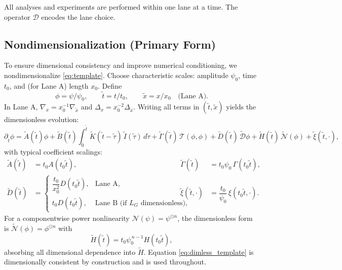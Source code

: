 \documentclass{article}
\theoremstyle{plain}
\begin{document}
All analyses and experiments are performed within one lane at a time. The operator $\mathcal{D}$ encodes the lane choice.

\subsection{Nondimensionalization (Primary Form)}

To ensure dimensional consistency and improve numerical conditioning, we nondimensionalize \eqref{eq:template}. Choose characteristic scales: amplitude $\psi_0$, time $t_0$, and (for Lane A) length $x_0$. Define
\begin{equation}
\phi = \psi/\psi_0,\qquad \tilde{t} = t/t_0,\qquad \tilde{x} = x/x_0\quad\text{(Lane A)}.
\label{eq:dimless_vars}
\end{equation}
In Lane A, $\nabla_x = x_0^{-1}\nabla_{\tilde{x}}$ and $\Delta_x = x_0^{-2}\Delta_{\tilde{x}}$. Writing all terms in $(\tilde{t},\tilde{x})$ yields the dimensionless evolution:
\begin{equation}
\partial_{\tilde{t}}\phi
= \tilde{A}(\tilde{t})\phi
+ \tilde{B}(\tilde{t})\int_{0}^{\tilde{t}}\tilde{K}(\tilde{t}-\tilde{\tau})\,\tilde{I}(\tilde{\tau})\,d\tilde{\tau}
+ \tilde{\Gamma}(\tilde{t})\,\mathcal{T}(\phi,\phi)
+ \tilde{D}(\tilde{t})\,\tilde{\mathcal{D}}\phi
+ \tilde{H}(\tilde{t})\,\tilde{\mathcal{N}}(\phi)
+ \tilde{\xi}(\tilde{t},\cdot),
\label{eq:dimless_template}
\end{equation}
with typical coefficient scalings:
\begin{align}
\tilde{A}(\tilde{t}) &= t_0 A(t_0\tilde{t}), &
\tilde{\Gamma}(\tilde{t}) &= t_0\psi_0\,\Gamma(t_0\tilde{t}), \\
\tilde{D}(\tilde{t}) &=
\begin{cases}
\dfrac{t_0}{x_0^2}D(t_0\tilde{t}), & \text{Lane A},\\[6pt]
t_0D(t_0\tilde{t}), & \text{Lane B (if $L_G$ dimensionless)},
\end{cases} &
\tilde{\xi}(\tilde{t},\cdot) &= \dfrac{t_0}{\psi_0}\,\xi(t_0\tilde{t},\cdot).
\label{eq:scalings}
\end{align}
For a componentwise power nonlinearity $\mathcal{N}(\psi)=\psi^{\odot n}$, the dimensionless form is $\tilde{\mathcal{N}}(\phi)=\phi^{\odot n}$ with
\begin{equation}
\tilde{H}(\tilde{t}) = t_0\psi_0^{\,n-1}H(t_0\tilde{t}),
\label{eq:nonlin_scaling}
\end{equation}
absorbing all dimensional dependence into $\tilde{H}$. Equation \eqref{eq:dimless_template} is dimensionally consistent by construction and is used throughout.
\end{document}
